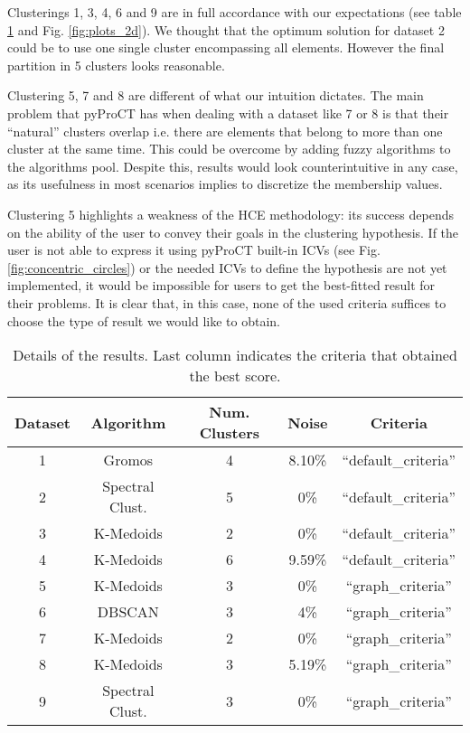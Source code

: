 Clusterings 1, 3, 4, 6 and 9 are in full accordance with
our expectations (see table \ref{tab:results_table} and Fig. \ref{fig:plots_2d}).
We thought that the optimum solution for dataset 2 could be to use
one single cluster encompassing all elements. However the final partition
in 5 clusters looks reasonable. 

Clustering 5, 7 and 8 are different of what our intuition dictates.
The main problem that pyProCT has when dealing with a dataset like
7 or 8 is that their ``natural'' clusters overlap i.e. there are
elements that belong to more than one cluster at the same time. This
could be overcome by adding fuzzy algorithms to the algorithms pool.
Despite this, results would look counterintuitive in any case, as its usefulness
in most scenarios implies to discretize the membership values.

Clustering 5 highlights a weakness of the HCE methodology: its success
depends on the ability of the user to convey their goals in the clustering
hypothesis. If the user is not able to express it using pyProCT built-in
ICVs (see Fig. \ref{fig:concentric_circles}) or the needed ICVs to define
the hypothesis are not yet implemented, it would be impossible for
users to get the best-fitted result for their problems. It is clear
that, in this case, none of the used criteria suffices to choose the
type of result we would like to obtain.

\begin{table}
\centering
\begin{tabular}{ c c c c c }
\toprule
Dataset & Algorithm & Num. Clusters & Noise & Criteria\\
\midrule
1 & Gromos & 4 & 8.10\% & ``default\_criteria''\\
2 & Spectral Clust. & 5 & 0\% & ``default\_criteria''\\
3 & K-Medoids & 2 & 0\% & ``default\_criteria''\\
4 & K-Medoids & 6 & 9.59\% & ``default\_criteria''\\
5 & K-Medoids & 3 & 0\% & ``graph\_criteria''\\
6 & DBSCAN & 3 & 4\% & ``graph\_criteria''\\
7 & K-Medoids & 2 & 0\% & ``graph\_criteria''\\
8 & K-Medoids & 3 & 5.19\% & ``graph\_criteria''\\
9 & Spectral Clust. & 3 & 0\% & ``graph\_criteria''\\
\bottomrule
\end{tabular}

\protect\caption{Details of the results. Last column indicates the criteria
that obtained the best score. \label{tab:results_table}}
\end{table}
